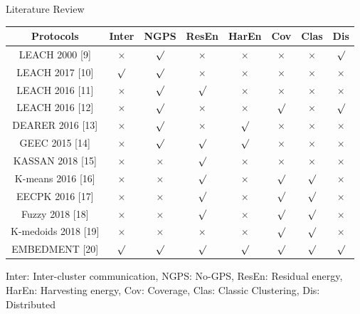 \documentclass{beamer}
\begin{document}
\begin{frame}[t]{Literature Review} %
\begin{table}[H]
\footnotesize
\begin{tabular}{|c|c|c|c|c|c|c|c|}
\hline
Protocols & Inter & NGPS & ResEn & HarEn & Cov & Clas & Dis \\ \hline
LEACH 2000 [9]& $\times$ & $\surd$ & $\times$ & $\times$ & $\times$ & $\times$ & $\surd$ \\ \hline
LEACH 2017 [10]& $\surd$ & $\surd$ & $\times$ & $\times$ & $\times$ & $\times$ & $\times$\\ \hline
LEACH 2016 [11]& $\times$ & $\surd$ & $\surd$ & $\times$ & $\times$ & $\times$ & $\times$\\ \hline
LEACH 2016 [12]& $\times$ & $\surd$ & $\times$ & $\times$ & $\surd$ & $\times$ & $\surd$\\ \hline
DEARER 2016 [13]& $\times$ & $\surd$ & $\times$ & $\surd$ & $\times$ & $\times$ & $\times$\\ \hline
GEEC 2015 [14]& $\times$ & $\surd$ & $\surd$ & $\surd$ & $\times$ & $\times$ & $\times$\\ \hline
KASSAN 2018 [15]& $\times$ & $\times$ & $\surd$ & $\times$ & $\times$ & $\times$ & $\times$\\ \hline \hline
K-means 2016 [16]& $\times$ & $\times$ & $\surd$ & $\times$ & $\surd$ & $\surd$ & $\times$\\ \hline
EECPK 2016 [17]& $\times$ & $\times$ & $\surd$ & $\times$ & $\surd$ & $\surd$ & $\times$\\ \hline
Fuzzy 2018 [18]& $\times$ & $\times$ & $\surd$ & $\times$ & $\surd$ & $\surd$ & $\times$\\ \hline
K-medoids 2018 [19]& $\times$ & $\times$ & $\times$ & $\times$ & $\surd$ & $\surd$ & $\times$\\ \hline
EMBEDMENT [20] & {\color{green} $\surd$} & {\color{green} $\surd$} & {\color{green} $\surd$} & {\color{green} $\surd$} &{\color{green} $\surd$} & {\color{green} $\surd$} & {\color{green} $\surd$}\\ \hline
\end{tabular}	
\end{table}
\tiny
Inter: Inter-cluster communication, NGPS: No-GPS, ResEn: Residual energy, HarEn: Harvesting energy, Cov: Coverage, Clas: Classic Clustering, Dis: Distributed
\end{frame}
\end{document}
